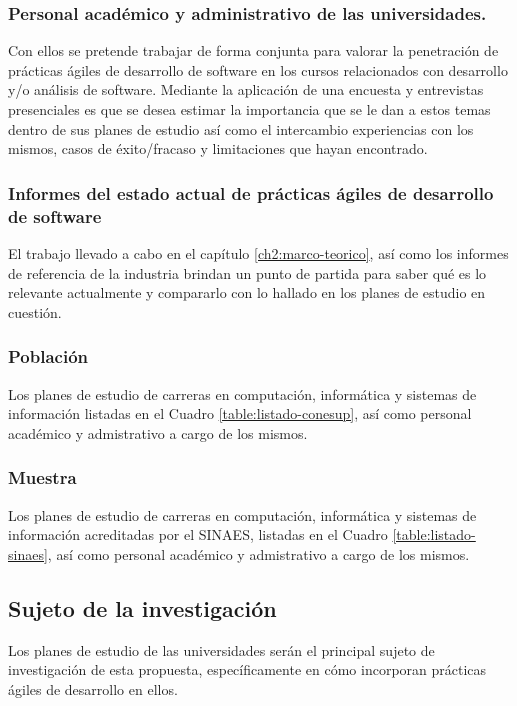 \subsubsection{Personal académico y administrativo de las universidades.} 
Con ellos se pretende trabajar de forma conjunta para valorar la penetración de prácticas ágiles de desarrollo de software en los cursos relacionados con desarrollo y/o análisis de software. Mediante la aplicación de una encuesta y entrevistas presenciales es que se desea estimar la importancia que se le dan a estos temas dentro de sus planes de estudio así como el intercambio experiencias con los mismos, casos de éxito/fracaso y limitaciones que hayan encontrado.

\subsubsection{Informes del estado actual de prácticas ágiles de desarrollo de software}
El trabajo llevado a cabo en el capítulo \ref{ch2:marco-teorico}, así como los informes de referencia de la industria \cite{version-one, puppet-devops} brindan un punto de partida para saber qué es lo relevante actualmente y compararlo con lo hallado en los planes de estudio en cuestión.


\subsubsection{Población}
Los planes de estudio de carreras en computación, informática y sistemas de información listadas en el Cuadro \ref{table:listado-conesup}, así como personal académico y admistrativo a cargo de los mismos.

\subsubsection{Muestra}
Los planes de estudio de carreras en computación, informática y sistemas de información acreditadas por el SINAES, listadas en el Cuadro \ref{table:listado-sinaes}, así como personal académico y admistrativo a cargo de los mismos.

\subsection{Sujeto de la investigación}
Los planes de estudio de las universidades serán el principal sujeto de investigación de esta propuesta, específicamente en cómo incorporan prácticas ágiles de desarrollo en ellos.


